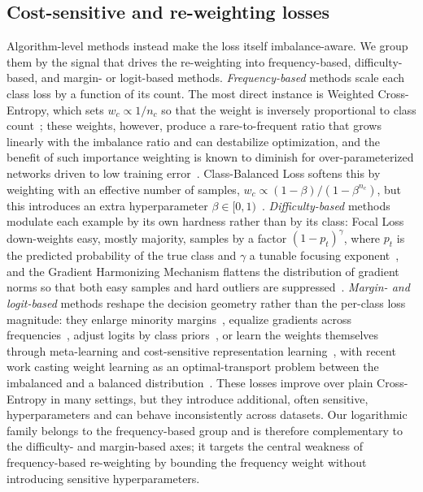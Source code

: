 \documentclass[a4paper,fleqn]{cas-sc}
\begin{document}
\subsection{Cost-sensitive and re-weighting losses}
Algorithm-level methods instead make the loss itself imbalance-aware. We group
them by the signal that drives the re-weighting into frequency-based,
difficulty-based, and margin- or logit-based methods.
\emph{Frequency-based} methods scale each class loss by a function of its count.
The most direct instance is Weighted Cross-Entropy, which sets $w_c \propto 1/n_c$
so that the weight is inversely proportional to class count~\citep{wang2019};
these weights, however, produce a rare-to-frequent ratio that grows linearly with
the imbalance ratio and can destabilize optimization, and the benefit of such
importance weighting is known to
diminish for over-parameterized networks driven to low training
error~\citep{byrd2019}. Class-Balanced Loss softens this by weighting with an
effective number of samples, $w_c \propto (1-\beta)/(1-\beta^{n_c})$, but this
introduces an extra hyperparameter $\beta \in [0,1)$~\citep{cui2019}.
\emph{Difficulty-based} methods modulate each example by its own hardness rather
than by its class: Focal Loss down-weights easy, mostly majority, samples by a factor
$(1-p_t)^{\gamma}$, where $p_t$ is the predicted probability of the true class and
$\gamma$ a tunable focusing exponent~\citep{lin2017}, and the Gradient Harmonizing
Mechanism flattens the distribution of gradient norms so that both easy samples
and hard outliers are suppressed~\citep{li2019ghm}.
\emph{Margin- and logit-based} methods reshape the decision geometry rather than
the per-class loss magnitude: they enlarge minority margins~\citep{cao2019},
equalize gradients across frequencies~\citep{tan2020}, adjust logits by class
priors~\citep{menon2021}, or learn the weights themselves through meta-learning
and cost-sensitive representation learning~\citep{ren2018,ren2020,khan2018}, with
recent work casting weight learning as an optimal-transport problem between the
imbalanced and a balanced distribution~\citep{guo2022}.
These losses improve over plain Cross-Entropy in many settings, but they
introduce additional, often sensitive, hyperparameters and can behave
inconsistently across datasets. Our logarithmic family belongs to the
frequency-based group and is therefore complementary to the difficulty- and
margin-based axes; it targets the central weakness of frequency-based
re-weighting by bounding the frequency weight without introducing sensitive
hyperparameters.
\end{document}
